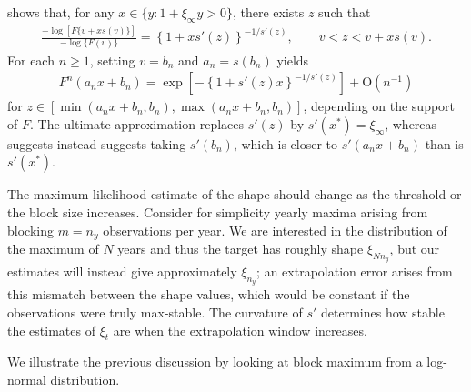 \documentclass[]{book}
\begin{document}
\citet{Smith:1987} shows that, for any \(x \in \{y:1+\xi_\infty y >0\}\), there exists \(z\) such that
\begin{align*}
   \frac{-\log[F\{v+xs(v)\}]}{-\log\{F(v)\}} = \left\{1+xs'(z)\right\}^{-1/s'(z)}, \qquad v < z < v+xs(v).
\end{align*}
For each \(n \geq 1\), setting \(v=b_n\) and \(a_n=s(b_n)\) yields
\begin{align*}
   F^n(a_nx+b_n)=\exp\left[-\left\{1+s'(z)x\right\}^{-1/s'(z)}\right] + \mathrm{O}(n^{-1})
\end{align*}
for \(z \in [\min(a_nx+b_n, b_n), \max(a_nx+b_n, b_n)]\), depending on the support of \(F\). The ultimate approximation replaces \(s'(z)\) by \(s'(x^*)=\xi_{\infty}\), whereas \citet{Smith:1987} suggests instead suggests taking \(s'(b_n)\), which is closer to \(s'(a_nx+b_n)\) than is \(s'(x^*)\).

The maximum likelihood estimate of the shape should change as the threshold or the block size increases. Consider for simplicity yearly maxima arising from blocking \(m=n_y\) observations per year. We are interested in the distribution of the maximum of \(N\) years and thus the target has roughly shape \(\xi_{Nn_y}\), but our estimates will instead give approximately \(\xi_{n_y}\); an extrapolation error arises from this mismatch between the shape values, which would be constant if the observations were truly max-stable. The curvature of \(s'\) determines how stable the estimates of \(\xi_t\) are when the extrapolation window increases.

We illustrate the previous discussion by looking at block maximum from a log-normal distribution.
\end{document}
